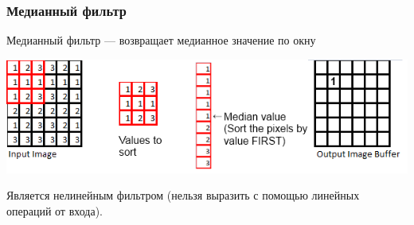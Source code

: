 \documentclass[fleqn, xcolor=x11names]{beamer}
\begin{document}
\begin{frame}[fragile]\frametitle{Медианный фильтр}
Медианный фильтр --- возвращает медианное значение по окну

\begin{center}
\includegraphics[scale=0.5]{images/sorting-median}
\end{center}

Является нелинейным фильтром (нельзя выразить с помощью линейных операций от входа).
\end{frame}
\end{document}
